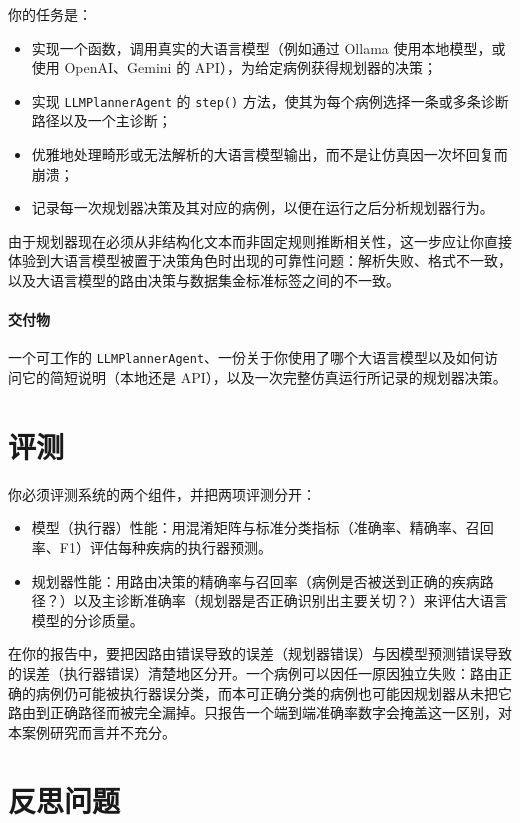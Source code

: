 你的任务是：
\begin{itemize}
    \item 实现一个函数，调用真实的大语言模型（例如通过 Ollama 使用本地模型，或使用 OpenAI、Gemini 的 API），为给定病例获得规划器的决策；
    \item 实现 \texttt{LLMPlannerAgent} 的 \texttt{step()} 方法，使其为每个病例选择一条或多条诊断路径以及一个主诊断；
    \item 优雅地处理畸形或无法解析的大语言模型输出，而不是让仿真因一次坏回复而崩溃；
    \item 记录每一次规划器决策及其对应的病例，以便在运行之后分析规划器行为。
\end{itemize}
%
由于规划器现在必须从非结构化文本而非固定规则推断相关性，这一步应让你直接体验到大语言模型被置于决策角色时出现的可靠性问题：解析失败、格式不一致，以及大语言模型的路由决策与数据集金标准标签之间的不一致。

\paragraph{交付物} 一个可工作的 \texttt{LLMPlannerAgent}、一份关于你使用了哪个大语言模型以及如何访问它的简短说明（本地还是 API），以及一次完整仿真运行所记录的规划器决策。



\section{评测}
\label{sec:case3-evaluation}

你必须评测系统的两个组件，并把两项评测分开：

\begin{itemize}
    \item 模型（执行器）性能：用混淆矩阵与标准分类指标（准确率、精确率、召回率、F1）评估每种疾病的执行器预测。
    \item 规划器性能：用路由决策的精确率与召回率（病例是否被送到正确的疾病路径？）以及主诊断准确率（规划器是否正确识别出主要关切？）来评估大语言模型的分诊质量。
\end{itemize}
%
在你的报告中，要把因路由错误导致的误差（规划器错误）与因模型预测错误导致的误差（执行器错误）清楚地区分开。一个病例可以因任一原因独立失败：路由正确的病例仍可能被执行器误分类，而本可正确分类的病例也可能因规划器从未把它路由到正确路径而被完全漏掉。只报告一个端到端准确率数字会掩盖这一区别，对本案例研究而言并不充分。


\section{反思问题}
\label{sec:case3-reflection}

